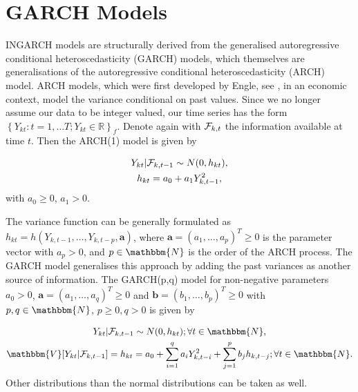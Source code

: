 
\section{GARCH Models}
\label{sec: Garch Models}

INGARCH models are structurally derived from the generalised autoregressive conditional heteroscedasticity (GARCH) models, which themselves are generalisations of the autoregressive conditional heteroscedasticity (ARCH) model. ARCH models, which were first developed by Engle, see \textcite{Engle:1982}, in an economic context, model the variance conditional on past values. Since we no longer assume our data to be integer valued, our time series has the form $\left\{Y_{kt}:t=1,\ldots T; Y_{kt} \in \mathbb{R}\right\}_f$. Denote again with $\mathcal{F}_{k,t}$ the information available at time $t$. Then the ARCH(1) model is given by \textcite{Engle:1982}

\begin{equation}
\begin{gathered}
Y_{kt} | \mathcal{F}_{k,t-1} \sim N(0,h_{kt}),\\
h_{kt} = a_0 + a_1 Y_{k,t-1}^2,
\label{eq:ARCH model}
\end{gathered}
\end{equation}
%
with $a_0\geq0$, $a_1>0$. 

The variance function can be generally formulated as $h_{kt} = h(Y_{k,t-1},\ldots,Y_{k,t-p},\bm{a})$, where $\bm{a}=(a_1,\ldots,a_p)^T\geq 0$ is the parameter vector with $a_p>0$, and $p \in \mathbbm{N}$ is the order of the ARCH process. 
The GARCH model generalises this approach by adding the past variances as another source of information. The GARCH(p,q) model for non-negative parameters $a_0>0$, $\bm{a}=(a_1,\ldots,a_q)^T\geq 0$ and $\bm{b}=(b_1,\ldots,b_p)^T\geq0$ with $p,q \in \mathbbm{N}$, $p\geq0, q>0$ is given by \textcite{Bollerslev:1986}

\begin{equation}
\begin{gathered}
Y_{kt} | \SigA_{k,t-1} \sim N(0,h_{kt}); \forall t \in \mathbbm{N}, \\
\mathbbm{V}[Y_{kt}|\SigA_{k,t-1}]=h_{kt} = a_0 + \sum_{i=1}^q a_i Y_{k,t-i}^2 + \sum_{j=1}^p b_j h_{k,t-j};\forall t \in \mathbbm{N}.
\label{eq:GARCH model}
\end{gathered}
\end{equation}
%
Other distributions than the normal distributions can be taken as well. 

